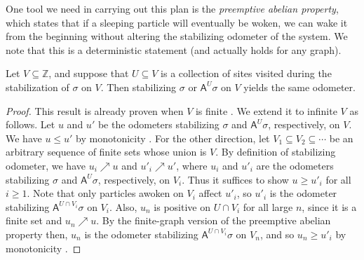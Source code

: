 \documentclass[ECP]{ejpecp} %
\begin{document}
One tool we need in carrying out this plan is the
\emph{preemptive abelian property}, which states that if a sleeping particle
will eventually be woken, we can wake it from the beginning without altering
the stabilizing odometer of the system. We note that this is a deterministic
statement (and actually holds for any graph).
%
\begin{lemma}%
\label{lem:preemptive}
Let $V\subseteq \mathbb{Z}$, and suppose that $U\subseteq V$ is a collection
of sites visited during the stabilization of $\sigma $ on $V$. Then stabilizing
$\sigma $ or $\mathsf{A}^{U}\sigma $ on $V$ yields the same odometer.
\end{lemma}
%
\begin{proof}
This result is already proven when $V$ is finite
\cite[Corollary~3.2]{cutoff}. We extend it to infinite $V$ as follows.
Let $u$ and $u'$ be the odometers stabilizing $\sigma $ and
$\mathsf{A}^{U}\sigma $, respectively, on $V$. We have $u\leq u'$ by monotonicity
\cite[Lemma~2.5]{rolla2020activated}. For the other direction, let
$V_{1}\subseteq V_{2}\subseteq \cdots $ be an arbitrary sequence of finite
sets whose union is $V$. By definition of stabilizing odometer, we have
$u_{i}\nearrow u$ and $u'_{i}\nearrow u'$, where $u_{i}$ and
$u'_{i}$ are the odometers stabilizing $\sigma $ and
$\mathsf{A}^{U}\sigma $, respectively, on $V_{i}$. Thus it suffices to
show $u \ge u'_{i}$ for all $i \ge 1$. Note that only particles awoken
on $V_{i}$ affect $u'_{i}$, so $u'_{i}$ is the odometer stabilizing
$\mathsf{A}^{U \cap V_{i}}\sigma $ on $V_{i}$. Also, $u_{n}$ is positive
on $U \cap V_{i}$ for all large $n$, since it is a finite set and
$u_{n} \nearrow u$. By the finite-graph version of the preemptive abelian
property \cite[Corollary~3.2]{cutoff} then, $u_{n}$ is the odometer stabilizing
$\mathsf{A}^{U \cap V_{i}}\sigma $ on $V_{n}$, and so
$u_{n} \ge u'_{i}$ by monotonicity
\cite[Lemma~2.5]{rolla2020activated}.
\end{proof}
\end{document}
